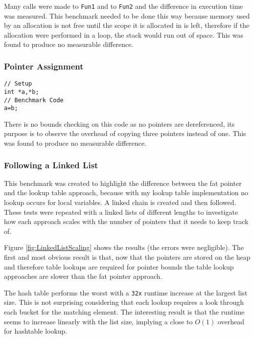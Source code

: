 Many calls were made to \verb!Fun1! and to \verb!Fun2! and the difference in execution time was measured.
This benchmark needed to be done this way because memory used by an allocation is not free until the scope it is allocated in is left, therefore if the allocation were performed in a loop, the stack would run out of space.
This was found to produce no measurable difference.

\subsubsection{Pointer Assignment}

\begin{verbatim}
// Setup
int *a,*b;
// Benchmark Code
a=b;
\end{verbatim}

There is no bounds checking on this code as no pointers are dereferenced, its purpose is to observe the overhead of copying three pointers instead of one.
This was found to produce no measurable difference.

\subsubsection{Following a Linked List}

This benchmark was created to highlight the difference between the fat pointer and the lookup table approach, because with my lookup table implementation no lookup occurs for local variables.
A linked chain is created and then followed.
These tests were repeated with a linked lists of different lengths to investigate how each approach scales with the number of pointers that it needs to keep track of.

Figure \ref{fig:LinkedListScaling} shows the results (the errors were negligible).
The first and most obvious result is that, now that the pointers are stored on the heap and therefore table lookups are required for pointer bounds the table lookup approaches are slower than the fat pointer approach.



The hash table performs the worst with a \verb!32x! runtime increase at the largest list size.
This is not surprising considering that each lookup requires a look through each bucket for the matching element.
The interesting result is that the runtime seems to increase linearly with the list size, implying a close to $O(1)$ overhead for hashtable lookup.

